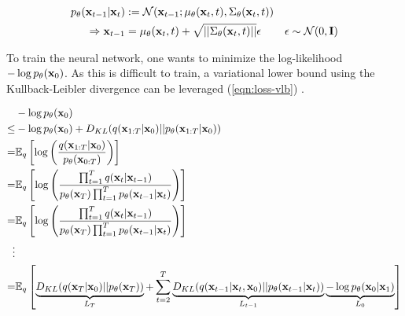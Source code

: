 \begin{equation}
   \label{eqn:reverse-process}
   \begin{aligned}
      p_\theta(\mathbf{x}_{t-1}|\mathbf{x}_t) & := \mathcal{N}(\mathbf{x}_{t-1};\mu_\theta(\mathbf{x}_t,t), \Sigma_\theta(\mathbf{x}_t,t))                                            \\
      \Rightarrow \mathbf{x}_{t-1}    & = \mu_\theta(\mathbf{x}_t,t) + \sqrt{||\Sigma_\theta(\mathbf{x}_t,t)||} \epsilon   & \epsilon \sim \mathcal{N}(0, \mathbf{I})
   \end{aligned}
\end{equation}

To train the neural network, one wants to minimize the log-likelihood $-\log p_\theta(\mathbf{x}_0)$.
As this is difficult to train, a variational lower bound using the Kullback-Leibler divergence can be leveraged (\autoref{eqn:loss-vlb}) \parencite{ddpm}.

\begin{equation}
   \label{eqn:loss-vlb}
   \begin{aligned}
             & -\log p_\theta(\mathbf{x}_0)                                                                                                                                                                                                           \\
      \leq   & -\log p_\theta(\mathbf{x}_0) + D_{KL}(q(\mathbf{x}_{1:T}|\mathbf{x}_0) || p_\theta(\mathbf{x}_{1:T}|\mathbf{x}_0))                                                                                                                                                     \\
      =      & \mathbb{E}_q\left[\log\left(\frac{q(\mathbf{x}_{1:T}|\mathbf{x}_0)}{p_\theta(\mathbf{x}_{0:T})}\right)\right]                                                                                                                                          \\
      =      & \mathbb{E}_q\left[\log\left(\frac{\prod_{t=1}^Tq(\mathbf{x}_t|\mathbf{x}_{t-1})}{p_\theta(\mathbf{x}_T)\prod_{t=1}^Tp_\theta(\mathbf{x}_{t-1}|\mathbf{x}_t)}\right)\right]                                                                                             \\
      =      & \mathbb{E}_q\left[\log\left(\frac{\prod_{t=1}^Tq(\mathbf{x}_t|\mathbf{x}_{t-1})}{p_\theta(\mathbf{x}_T)\prod_{t=1}^Tp_\theta(\mathbf{x}_{t-1}|\mathbf{x}_t)}\right)\right]                                                                                             \\
      \vdots &                                                                                                                                                                                                                                \\
      =      & \mathbb{E}_q\left[ \underbrace{D_{KL}(q(\mathbf{x}_T|\mathbf{x}_0)||p_\theta(\mathbf{x}_T))}_{L_T} + \sum_{t=2}^T \underbrace{D_{KL}(q(\mathbf{x}_{t-1}|\mathbf{x}_t,\mathbf{x}_0)||p_\theta(\mathbf{x}_{t-1}|\mathbf{x}_t))}_{L_{t-1}} \underbrace{ - \log p_\theta(\mathbf{x}_0|\mathbf{x}_1)}_{L_0} \right] \\
   \end{aligned}
\end{equation}

